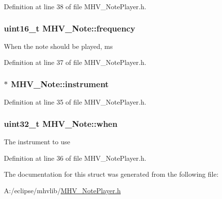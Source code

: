 Definition at line 38 of file M\-H\-V\-\_\-\-Note\-Player.\-h.

\hypertarget{struct_m_h_v___note_a24c7addceca4036405ee15ecb0a01c71}{
\subsubsection[{frequency}]{\setlength{\rightskip}{0pt plus 5cm}uint16\-\_\-t M\-H\-V\-\_\-\-Note\-::frequency}}\label{struct_m_h_v___note_a24c7addceca4036405ee15ecb0a01c71}
When the note should be played, ms 

Definition at line 37 of file M\-H\-V\-\_\-\-Note\-Player.\-h.

\hypertarget{struct_m_h_v___note_ae799998aafadeb322df99805a9c0d1bf}{
\subsubsection[{instrument}]{$\ast$ M\-H\-V\-\_\-\-Note\-::instrument}}\label{struct_m_h_v___note_ae799998aafadeb322df99805a9c0d1bf}


Definition at line 35 of file M\-H\-V\-\_\-\-Note\-Player.\-h.

\hypertarget{struct_m_h_v___note_a561bc0a1d803744be9908e23fed4a017}{
\subsubsection[{when}]{\setlength{\rightskip}{0pt plus 5cm}uint32\-\_\-t M\-H\-V\-\_\-\-Note\-::when}}\label{struct_m_h_v___note_a561bc0a1d803744be9908e23fed4a017}
The instrument to use 

Definition at line 36 of file M\-H\-V\-\_\-\-Note\-Player.\-h.



The documentation for this struct was generated from the following file\-:\begin{DoxyCompactItemize}
\item 
A\-:/eclipse/mhvlib/\hyperlink{_m_h_v___note_player_8h}{M\-H\-V\-\_\-\-Note\-Player.\-h}\end{DoxyCompactItemize}
